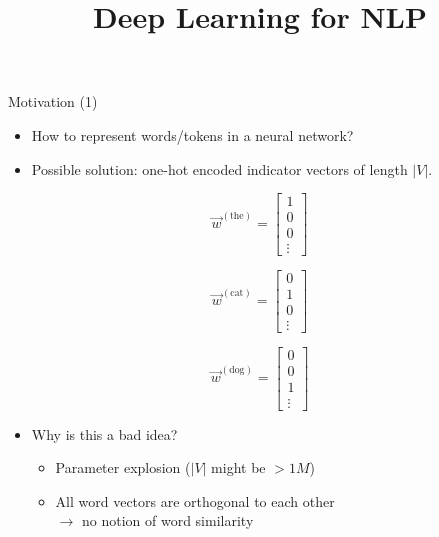 \documentclass[11pt,compress,t,notes=noshow, xcolor=table]{beamer}
\title{Deep Learning for NLP}
\begin{document}


\begin{vbframe}{Motivation (1)}

\vfill

\begin{itemize}
	\item How to represent words/tokens in a neural network?
	\item Possible solution: one-hot encoded indicator vectors of length $|V|$.
\end{itemize}

\begin{center}
\begin{minipage}{.2\textwidth}
	\[\vec w^{({\text{the}})} =
	\begin{bmatrix}
	1 \\ 0 \\ 0 \\ \vdots
	\end{bmatrix}
	\]
\end{minipage}
\begin{minipage}{.2\textwidth}
	\[\vec w^{({\text{cat}})} =
	\begin{bmatrix}
	0 \\ 1 \\ 0 \\ \vdots
	\end{bmatrix}
	\]
\end{minipage}
\begin{minipage}{.2\textwidth}
\[\vec w^{({\text{dog}})} =
\begin{bmatrix}
0 \\ 0 \\ 1 \\ \vdots
\end{bmatrix}
\]
\end{minipage}
\end{center}

\begin{itemize}
	\item \ques Why is this a bad idea?
		\begin{itemize}
			\item Parameter explosion ($|V|$ might be $> 1M$)
			\item All word vectors are orthogonal to each other\\$\rightarrow$ no notion of word similarity
		\end{itemize}
\end{itemize}

\vfill

\end{vbframe}
\end{document}
